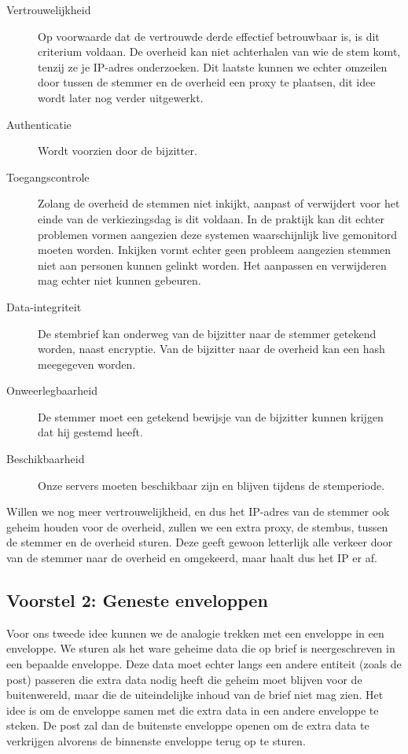 \documentclass[a4paper,12pt]{article}
\begin{document}
\begin{description}
    \item[Vertrouwelijkheid] Op voorwaarde dat de vertrouwde derde effectief
      betrouwbaar is, is dit criterium voldaan. De overheid kan niet achterhalen
      van wie de stem komt, tenzij ze je IP-adres onderzoeken. Dit laatste
      kunnen we echter omzeilen door tussen de stemmer en de overheid een proxy
      te plaatsen, dit idee wordt later nog verder uitgewerkt.
    \item[Authenticatie] Wordt voorzien door de bijzitter.
    \item[Toegangscontrole] Zolang de overheid de stemmen niet inkijkt, aanpast
      of verwijdert voor het einde van de verkiezingsdag is dit voldaan. In de
      praktijk kan dit echter problemen vormen aangezien deze systemen
      waarschijnlijk live gemonitord moeten worden. Inkijken vormt echter geen
      probleem aangezien stemmen niet aan personen kunnen gelinkt worden. Het
      aanpassen en verwijderen mag echter niet kunnen gebeuren.
    \item[Data-integriteit] De stembrief kan onderweg van de bijzitter naar de
        stemmer getekend worden, naast encryptie. Van de bijzitter naar de
        overheid kan een hash meegegeven worden.
    \item[Onweerlegbaarheid] De stemmer moet een getekend bewijsje van de
        bijzitter kunnen krijgen dat hij gestemd heeft.
    \item[Beschikbaarheid] Onze servers moeten beschikbaar zijn en blijven
      tijdens de stemperiode.
\end{description}

Willen we nog meer vertrouwelijkheid, en dus het IP-adres van de stemmer ook
geheim houden voor de overheid, zullen we een extra proxy, de stembus, tussen de
stemmer en de overheid sturen. Deze geeft gewoon letterlijk alle verkeer door
van de stemmer naar de overheid en omgekeerd, maar haalt dus het IP er af.

\subsection{Voorstel 2: Geneste enveloppen}

Voor ons tweede idee kunnen we de analogie trekken met een enveloppe in een
enveloppe. We sturen als het ware geheime data die op brief is neergeschreven in
een bepaalde enveloppe. Deze data moet echter langs een andere entiteit (zoals
de post) passeren die extra data nodig heeft die geheim moet blijven voor de
buitenwereld, maar die de uiteindelijke inhoud van de brief niet mag zien. Het
idee is om de enveloppe samen met die extra data in een andere enveloppe te
steken. De post zal dan de buitenste enveloppe openen om de extra data te
verkrijgen alvorens de binnenste enveloppe terug op te sturen.
\end{document}
